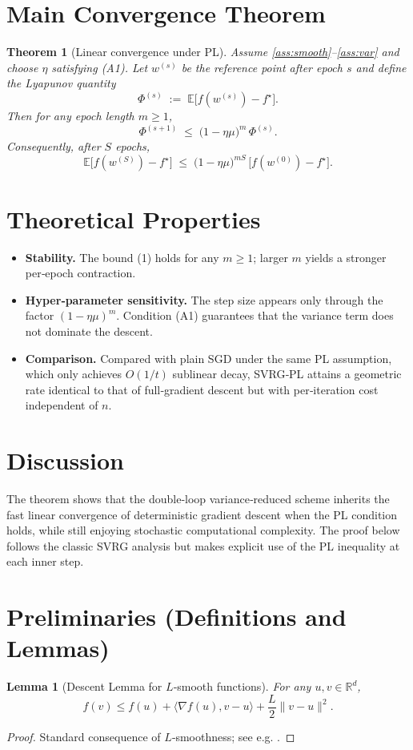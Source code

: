 \documentclass{article}
\newtheorem{theorem}{Theorem}
\newtheorem{lemma}{Lemma}
\begin{document}
\section*{Main Convergence Theorem}
\begin{theorem}[Linear convergence under PL]\label{thm:linear}
Assume \ref{ass:smooth}–\ref{ass:var} and choose $\eta$ satisfying (A1).  
Let $w^{(s)}$ be the reference point after epoch $s$ and define the Lyapunov quantity
\[
\Phi^{(s)} \;:=\; \mathbb{E}\bigl[f(w^{(s)})-f^\star\bigr] .
\]
Then for any epoch length $m\ge 1$,
\[
\Phi^{(s+1)}\;\le\;\bigl(1-\eta\mu\bigr)^{m}\,\Phi^{(s)} .
\tag{1}
\]
Consequently, after $S$ epochs,
\[
\mathbb{E}\bigl[f(w^{(S)})-f^\star\bigr]\;\le\;
\bigl(1-\eta\mu\bigr)^{mS}\,\bigl[f(w^{(0)})-f^\star\bigr] .
\tag{2}
\]
\end{theorem}

\section*{Theoretical Properties}
\begin{itemize}
\item \textbf{Stability.} The bound (1) holds for any $m\ge1$; larger $m$ yields a stronger per‑epoch contraction.
\item \textbf{Hyper‑parameter sensitivity.} The step size appears only through the factor $(1-\eta\mu)^{m}$. Condition (A1) guarantees that the variance term does not dominate the descent.
\item \textbf{Comparison.} Compared with plain SGD under the same PL assumption, which only achieves $O(1/t)$ sublinear decay, SVRG‑PL attains a geometric rate identical to that of full‑gradient descent but with per‑iteration cost independent of $n$.
\end{itemize}

\section*{Discussion}
The theorem shows that the double‑loop variance‑reduced scheme inherits the fast linear convergence of deterministic gradient descent when the PL condition holds, while still enjoying stochastic computational complexity. The proof below follows the classic SVRG analysis but makes explicit use of the PL inequality at each inner step.

\newpage
\section*{Preliminaries (Definitions and Lemmas)}
\begin{lemma}[Descent Lemma for $L$‑smooth functions]\label{lem:descent}
For any $u,v\in\mathbb{R}^d$,
\[
f(v)\le f(u)+\langle\nabla f(u),v-u\rangle+\frac{L}{2}\|v-u\|^2 .
\]
\end{lemma}
\begin{proof}
Standard consequence of $L$‑smoothness; see e.g. \cite{nesterov2004introductory}. \qedhere
\end{proof}
\end{document}
